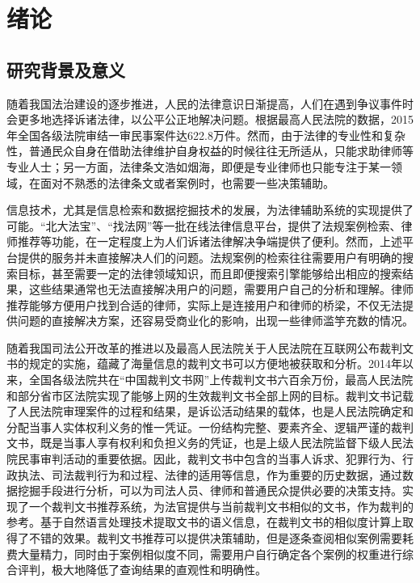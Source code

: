 ﻿%
\chapter{绪论}

    \section{研究背景及意义}
    随着我国法治建设的逐步推进，人民的法律意识日渐提高，人们在遇到争议事件时会更多地选择诉诸法律，以公平公正地解决问题。根据最高人民法院的数据，2015年全国各级法院审结一审民事案件达622.8万件。然而，由于法律的专业性和复杂性，普通民众自身在借助法律维护自身权益的时候往往无所适从，只能求助律师等专业人士；另一方面，法律条文浩如烟海，即便是专业律师也只能专注于某一领域，在面对不熟悉的法律条文或者案例时，也需要一些决策辅助。

    信息技术，尤其是信息检索和数据挖掘技术的发展，为法律辅助系统的实现提供了可能。“北大法宝”、“找法网”等一批在线法律信息平台，提供了法规案例检索、律师推荐等功能，在一定程度上为人们诉诸法律解决争端提供了便利。然而，上述平台提供的服务并未直接解决人们的问题。法规案例的检索往往需要用户有明确的搜索目标，甚至需要一定的法律领域知识，而且即便搜索引擎能够给出相应的搜索结果，这些结果通常也无法直接解决用户的问题，需要用户自己的分析和理解。律师推荐能够方便用户找到合适的律师，实际上是连接用户和律师的桥梁，不仅无法提供问题的直接解决方案，还容易受商业化的影响，出现一些律师滥竽充数的情况。

    随着我国司法公开改革的推进以及最高人民法院关于人民法院在互联网公布裁判文书的规定的实施，蕴藏了海量信息的裁判文书可以方便地被获取和分析。2014年以来，全国各级法院共在“中国裁判文书网”上传裁判文书六百余万份，最高人民法院和部分省市区法院实现了能够上网的生效裁判文书全部上网的目标。裁判文书记载了人民法院审理案件的过程和结果，是诉讼活动结果的载体，也是人民法院确定和分配当事人实体权利义务的惟一凭证。一份结构完整、要素齐全、逻辑严谨的裁判文书，既是当事人享有权利和负担义务的凭证，也是上级人民法院监督下级人民法院民事审判活动的重要依据。因此，裁判文书中包含的当事人诉求、犯罪行为、行政执法、司法裁判行为和过程、法律的适用等信息，作为重要的历史数据，通过数据挖掘手段进行分析，可以为司法人员、律师和普通民众提供必要的决策支持。\cite{向李兴2015基于自然语义处理的裁判文书推荐系统设计与实现}实现了一个裁判文书推荐系统，为法官提供与当前裁判文书相似的文书，作为裁判的参考。基于自然语言处理技术提取文书的语义信息，在裁判文书的相似度计算上取得了不错的效果。裁判文书推荐可以提供决策辅助，但是逐条查阅相似案例需要耗费大量精力，同时由于案例相似度不同，需要用户自行确定各个案例的权重进行综合评判，极大地降低了查询结果的直观性和明确性。

